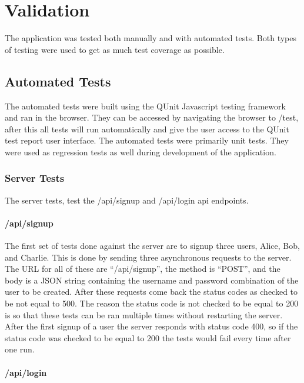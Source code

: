 \chapter{Validation}


The application was tested both manually and with automated tests. Both types of testing were used to get as much test coverage as possible.


\section{Automated Tests}


The automated tests were built using the QUnit Javascript testing framework and ran in the browser.\cite{qunit} They can be accessed by navigating the browser to /test, after this all tests will run automatically and give the user access to the QUnit test report user interface. The automated tests were primarily unit tests. They were used as regression tests as well during development of the application. 


\subsection{Server Tests}


The server tests, test the /api/signup and /api/login api endpoints. 


\subsubsection{/api/signup}


The first set of tests done against the server are to signup three users, Alice, Bob, and Charlie.
This is done by sending three asynchronous requests to the server. The URL for all of these are “/api/signup”, the method is “POST”, and the body is a JSON string containing the username and password combination of the user to be created. After these requests come back the status codes as checked to be not equal to 500. The reason the status code is not checked to be equal to 200 is so that these tests can be ran multiple times without restarting the server. After the first signup of a user the server responds with status code 400, so if the status code was checked to be equal to 200 the tests would fail every time after one run.


\subsubsection{/api/login}


